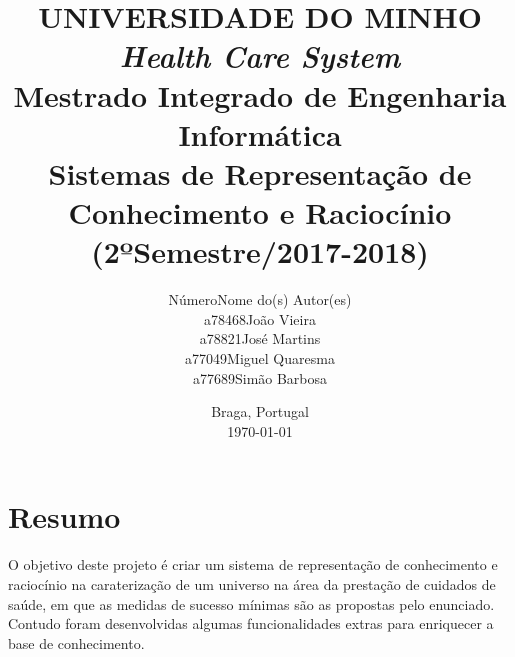\documentclass{article}
\begin{document}
\title{\Huge
       \textbf{UNIVERSIDADE DO MINHO}\\
       \vspace*{3cm}
       \huge
       \textbf{\textit{Health Care System}}\\
       \vspace*{3cm}
       \large
       Mestrado Integrado de Engenharia Informática\\
       \vspace*{2cm}
       Sistemas de Representação de Conhecimento e Raciocínio\\
       (2ºSemestre/2017-2018)
       \vspace*{\fill}}

\author{\hspace*{-5cm}Número\hspace*{1cm}Nome do(s) Autor(es)\hspace*{\fill}\\
        \hspace*{-5cm}a78468\hspace*{1cm}João Vieira\hspace*{\fill}\\
        \hspace*{-5cm}a78821\hspace*{1cm}José Martins\hspace*{\fill}\\
        \hspace*{-5cm}a77049\hspace*{1cm}Miguel Quaresma\hspace*{\fill}\\
        \hspace*{-5cm}a77689\hspace*{1cm}Simão Barbosa\hspace*{\fill}}

\date{\hspace*{\fill}Braga, Portugal\hspace*{1cm}\\
      \hspace*{\fill}\today\hspace*{1cm}}

\maketitle

\newpage

\justify

\vspace*{\fill}
\section{Resumo}
O objetivo deste projeto é criar um sistema de representação de conhecimento e raciocínio na caraterização de um universo na área da prestação de cuidados de saúde, em que as medidas de sucesso mínimas são as propostas pelo enunciado. Contudo foram desenvolvidas algumas funcionalidades extras para enriquecer a base de conhecimento. 
\vspace*{\fill}
\end{document}
